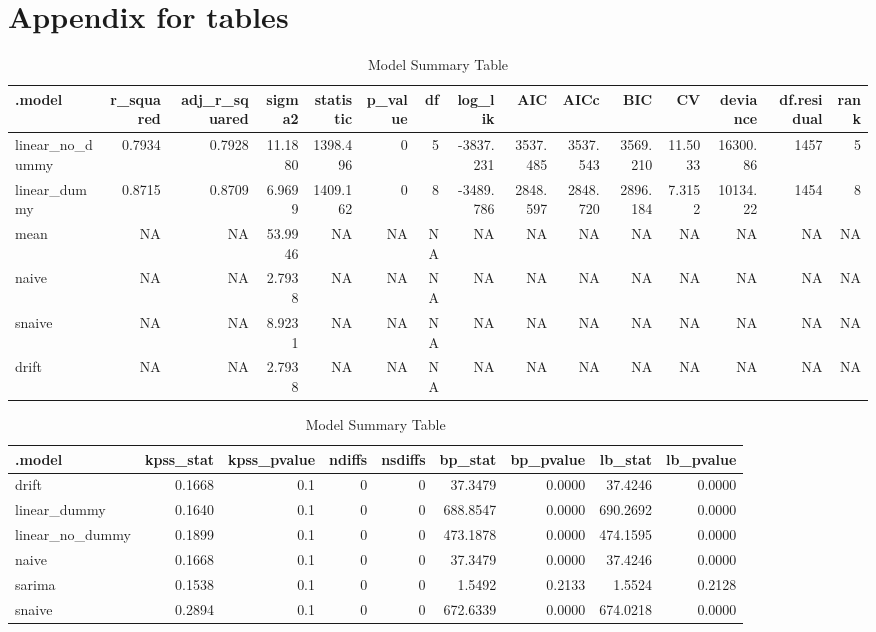 \newpage
\section{Appendix for tables}

\begin{table}[!h]
    \centering
    \caption{Model Summary Table}
    \centering
    \begin{tabular}[t]{lrrrrrrrrrrrrrr}
    \toprule
    .model & r\_squared & adj\_r\_squared & sigma2 & statistic & p\_value & df & log\_lik & AIC & AICc & BIC & CV & deviance & df.residual & rank\\
    \midrule
    linear\_no\_dummy & 0.7934 & 0.7928 & 11.1880 & 1398.496 & 0 & 5 & -3837.231 & 3537.485 & 3537.543 & 3569.210 & 11.5033 & 16300.86 & 1457 & 5\\
    linear\_dummy & 0.8715 & 0.8709 & 6.9699 & 1409.162 & 0 & 8 & -3489.786 & 2848.597 & 2848.720 & 2896.184 & 7.3152 & 10134.22 & 1454 & 8\\
    mean & NA & NA & 53.9946 & NA & NA & NA & NA & NA & NA & NA & NA & NA & NA & NA\\
    naive & NA & NA & 2.7938 & NA & NA & NA & NA & NA & NA & NA & NA & NA & NA & NA\\
    snaive & NA & NA & 8.9231 & NA & NA & NA & NA & NA & NA & NA & NA & NA & NA & NA\\
    \addlinespace
    drift & NA & NA & 2.7938 & NA & NA & NA & NA & NA & NA & NA & NA & NA & NA & NA\\
    \bottomrule
    \end{tabular}
\end{table}

\begin{table}[!h]
    \centering
    \caption{Model Summary Table}
    \centering
    \begin{tabular}[t]{lrrrrrrrr}
    \toprule
    .model & kpss\_stat & kpss\_pvalue & ndiffs & nsdiffs & bp\_stat & bp\_pvalue & lb\_stat & lb\_pvalue\\
    \midrule
    drift & 0.1668 & 0.1 & 0 & 0 & 37.3479 & 0.0000 & 37.4246 & 0.0000\\
    linear\_dummy & 0.1640 & 0.1 & 0 & 0 & 688.8547 & 0.0000 & 690.2692 & 0.0000\\
    linear\_no\_dummy & 0.1899 & 0.1 & 0 & 0 & 473.1878 & 0.0000 & 474.1595 & 0.0000\\
    naive & 0.1668 & 0.1 & 0 & 0 & 37.3479 & 0.0000 & 37.4246 & 0.0000\\
    sarima & 0.1538 & 0.1 & 0 & 0 & 1.5492 & 0.2133 & 1.5524 & 0.2128\\
    \addlinespace
    snaive & 0.2894 & 0.1 & 0 & 0 & 672.6339 & 0.0000 & 674.0218 & 0.0000\\
    \bottomrule
    \end{tabular}
\end{table}

